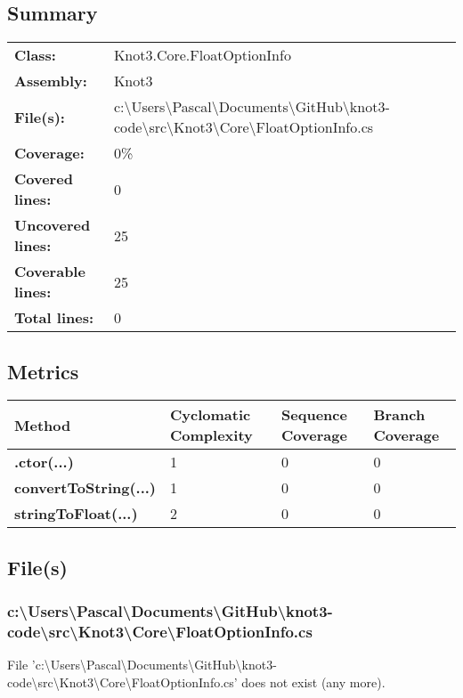 \documentclass[a4paper,10pt]{article}
\begin{document}
\subsection{Summary}
\begin{longtable}[l]{ll}
\textbf{Class:} & Knot3.Core.FloatOptionInfo\\
\textbf{Assembly:} & Knot3\\
\textbf{File(s):} & \begin{minipage}[t]{12cm}{c:\textbackslash Users\textbackslash Pascal\textbackslash Documents\textbackslash GitHub\textbackslash knot3-code\textbackslash src\textbackslash Knot3\textbackslash Core\textbackslash FloatOptionInfo.cs}\end{minipage} \\
\textbf{Coverage:} & 0\%\\
\textbf{Covered lines:} & 0\\
\textbf{Uncovered lines:} & 25\\
\textbf{Coverable lines:} & 25\\
\textbf{Total lines:} & 0\\
\end{longtable}
\subsection{Metrics}
\begin{longtable}[l]{|l|l|l|l|}
\hline
\textbf{Method} & \textbf{Cyclomatic Complexity} & \textbf{Sequence Coverage} & \textbf{Branch Coverage}\\
\hline
\textbf{.ctor(...)} & 1 & 0 & 0\\
\hline
\textbf{convertToString(...)} & 1 & 0 & 0\\
\hline
\textbf{stringToFloat(...)} & 2 & 0 & 0\\
\hline
\end{longtable}
\subsection{File(s)}
\subsubsection{c:\textbackslash Users\textbackslash Pascal\textbackslash Documents\textbackslash GitHub\textbackslash knot3-code\textbackslash src\textbackslash Knot3\textbackslash Core\textbackslash FloatOptionInfo.cs}
 File 'c:\textbackslash Users\textbackslash Pascal\textbackslash Documents\textbackslash GitHub\textbackslash knot3-code\textbackslash src\textbackslash Knot3\textbackslash Core\textbackslash FloatOptionInfo.cs' does not exist (any more).
\newpage
\end{document}
